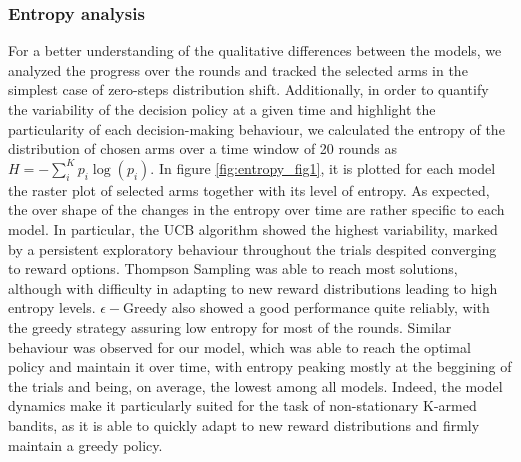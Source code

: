 \subsubsection{Entropy analysis}\label{sec:entropy}
\noindent For a better understanding of the qualitative differences between the models, we analyzed the progress over the rounds and tracked the selected arms in the simplest case of zero-steps distribution shift. Additionally, in order to quantify the variability of the decision policy at a given time and highlight the particularity of each
decision-making behaviour, we calculated the entropy of the distribution of chosen
arms over a time window of 20 rounds as $H=-\sum^{K}_{i} p_{i}\log(p_{i})$. In figure \ref{fig:entropy_fig1}, it is plotted for each model the raster plot of selected arms together with its level of entropy. As expected, the over shape of the changes in the entropy over time are rather specific to
each model. In particular, the UCB algorithm showed the highest variability, marked by a persistent exploratory behaviour throughout the trials despited converging to reward options. Thompson Sampling was able to reach most solutions, although with difficulty in adapting to new reward distributions
leading to high entropy levels.
$\epsilon-$Greedy also showed a good performance quite reliably, with the greedy strategy assuring low entropy for most of the rounds.
Similar behaviour was observed for our model, which was able to reach the optimal policy and maintain it over time, with entropy peaking mostly at the beggining of the trials and being, on average, the lowest among all models.
Indeed, the model dynamics make it particularly suited for the task of non-stationary K-armed bandits, as it is able to quickly adapt to new reward distributions and firmly maintain a greedy policy.

